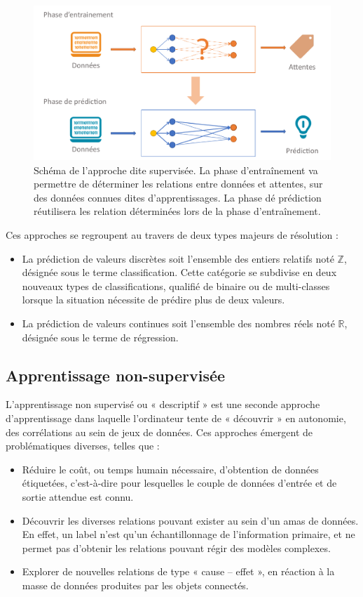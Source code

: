 \begin{figure}[H]
    \centering
    \includegraphics[width=0.8\linewidth]{contents/chapter_3/resources/scheme_supervised_classification.pdf}
    \caption{Schéma de l’approche dite supervisée. La phase d'entraînement va permettre de déterminer les relations entre données et attentes, sur des données connues dites d'apprentissages. La phase dé prédiction réutilisera les relation déterminées lors de la phase d'entraînement. }
    \label{fig:scheme_supervised_classification}
\end{figure}

Ces approches se regroupent au travers de deux types majeurs de résolution :
\begin{itemize}
    \item La prédiction de valeurs discrètes soit l’ensemble des entiers relatifs noté $\pmb{\mathbb{Z}}$, désignée sous le terme classification. Cette catégorie se subdivise en deux nouveaux types de classifications, qualifié de binaire ou de multi-classes lorsque la situation nécessite de prédire plus de deux valeurs.
    \item La prédiction de valeurs continues soit l’ensemble des nombres réels noté $\pmb{\mathbb{R}}$, désignée sous le terme de régression.
\end{itemize}\par

\subsection{Apprentissage non-supervisée}
L’apprentissage non supervisé ou « descriptif » est une seconde approche d’apprentissage dans laquelle l’ordinateur tente de « découvrir » en autonomie, des corrélations au sein de jeux de données. Ces approches émergent de problématiques diverses, telles que :
\begin{itemize}
    \item Réduire le coût, ou temps humain nécessaire, d’obtention de données étiquetées, c’est-à-dire pour lesquelles le couple de données d’entrée et de sortie attendue est connu.
    \item Découvrir les diverses relations pouvant exister au sein d’un amas de données. En effet, un label n’est qu’un échantillonnage de l’information primaire, et ne permet pas d’obtenir les relations pouvant régir des modèles complexes.
    \item Explorer de nouvelles relations de type « cause – effet », en réaction à la masse de données produites par les objets connectés. 
\end{itemize}\par

